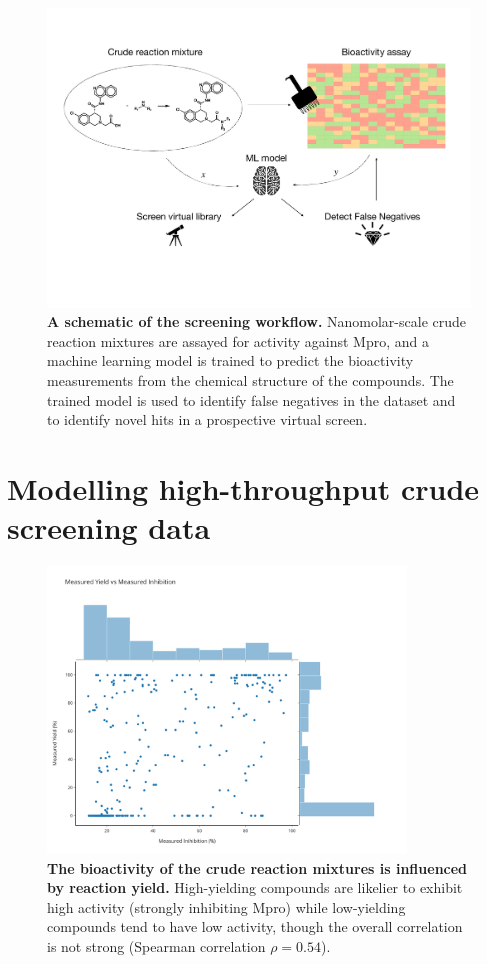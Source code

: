 \begin{figure}[!t]
 \centering
 \includegraphics[width=\textwidth]{Chapters/Crude/Figs/schematic.pdf}
 \caption{\textbf{A schematic of the screening workflow.} Nanomolar-scale crude reaction mixtures are assayed for activity against Mpro, and a machine learning model is trained to predict the bioactivity measurements from the chemical structure of the compounds. The trained model is used to identify false negatives in the dataset and to identify novel hits in a prospective virtual screen.}
 \label{fig:schematic}
\end{figure}

\section{Modelling high-throughput crude screening data}

\begin{figure}[!t]
 \centering
 \includegraphics[width=0.85\textwidth]{Chapters/Crude/Figs/yield_vs_activity.pdf}
 \caption{\textbf{The bioactivity of the crude reaction mixtures is influenced by reaction yield.} High-yielding compounds are likelier to exhibit high activity (strongly inhibiting Mpro) while low-yielding compounds tend to have low activity, though the overall correlation is not strong (Spearman correlation $\rho = 0.54$).}
 \label{fig:yield_activity}
\end{figure}

